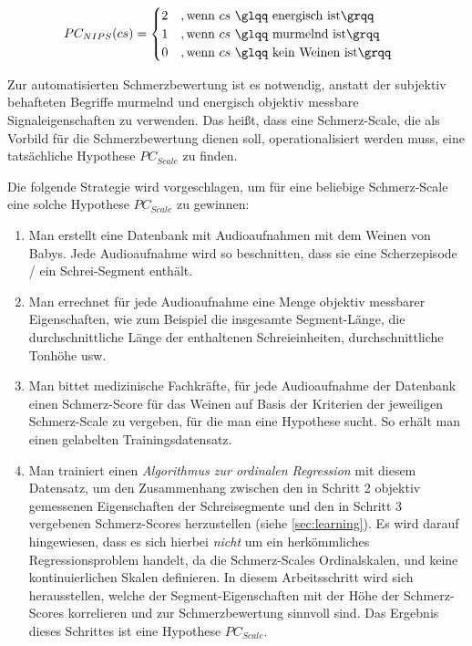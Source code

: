 \begin{equation}
PC_{NIPS}(cs) = \begin{cases}
 2 \quad ,\text{wenn } cs \text{ \glqq energisch ist\grqq } \\
 1 \quad ,\text{wenn } cs \text{ \glqq murmelnd ist\grqq } \\
 0 \quad ,\text{wenn } cs \text{ \glqq kein Weinen ist\grqq }
 \end{cases}	
\end{equation}

Zur automatisierten Schmerzbewertung ist es notwendig, anstatt der subjektiv behafteten Begriffe \glqq murmelnd\grqq{} und \glqq energisch\grqq{} objektiv messbare Signaleigenschaften zu verwenden. Das heißt, dass eine Schmerz-Scale, die als Vorbild für die Schmerzbewertung dienen soll, operationalisiert werden muss, eine tatsächliche Hypothese $PC_{Scale}$ zu finden.


Die folgende Strategie wird vorgeschlagen, um für eine beliebige Schmerz-Scale eine solche Hypothese $PC_{Scale}$ zu gewinnen:

\begin{enumerate}
 \item Man erstellt eine Datenbank mit Audioaufnahmen mit dem Weinen von Babys. Jede Audioaufnahme wird so beschnitten, dass sie eine Scherzepisode / ein Schrei-Segment enthält.
 \item Man errechnet für jede Audioaufnahme eine Menge objektiv messbarer Eigenschaften, wie zum Beispiel die insgesamte Segment-Länge, die durchschnittliche Länge der enthaltenen Schreieinheiten, durchschnittliche Tonhöhe usw.
 \item Man bittet medizinische Fachkräfte, für jede Audioaufnahme der Datenbank einen Schmerz-Score für das Weinen auf Basis der Kriterien der jeweiligen Schmerz-Scale zu vergeben, für die man eine Hypothese sucht. So erhält man einen gelabelten Trainingsdatensatz.
 \item Man trainiert einen \emph{Algorithmus zur ordinalen Regression} mit diesem Datensatz, um den Zusammenhang zwischen den in Schritt 2 objektiv gemessenen Eigenschaften der Schreisegmente und den in Schritt 3 vergebenen Schmerz-Scores herzustellen (siehe \autoref{sec:learning}). Es wird darauf hingewiesen, dass es sich hierbei \emph{nicht} um ein herkömmliches Regressionsproblem handelt, da die Schmerz-Scales Ordinalskalen, und keine kontinuierlichen Skalen definieren. In diesem Arbeitsschritt wird sich herausstellen, welche der Segment-Eigenschaften mit der Höhe der Schmerz-Scores korrelieren und zur Schmerzbewertung sinnvoll sind. Das Ergebnis dieses Schrittes ist eine Hypothese $PC_{Scale}$.
\end{enumerate}


